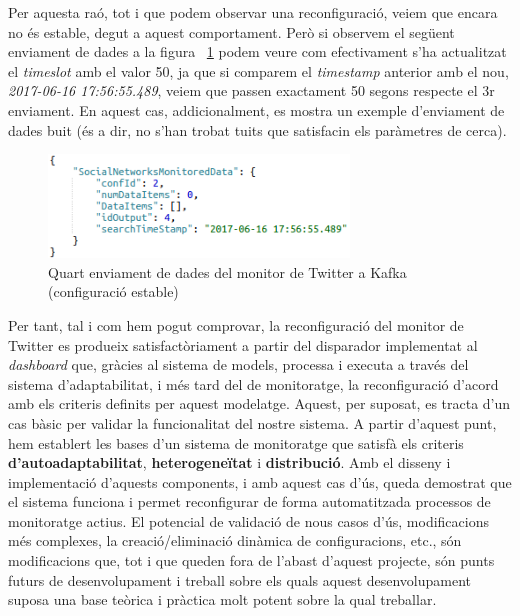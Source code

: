 Per aquesta raó, tot i que podem observar una reconfiguració, veiem que encara no és estable, degut a aquest comportament. Però si observem el següent enviament de dades a la figura ~\ref{fig:tfg4} podem veure com efectivament s'ha actualitzat el \textit{timeslot} amb el valor 50, ja que si comparem el \textit{timestamp} anterior amb el nou, \textit{2017-06-16 17:56:55.489}, veiem que passen exactament 50 segons respecte el 3r enviament. En aquest cas, addicionalment, es mostra un exemple d'enviament de dades buit (és a dir, no s'han trobat tuits que satisfacin els paràmetres de cerca). \\

\begin{figure}[H]
\centering
\includegraphics[width=8cm]{Figures/tfg4}
\decoRule
\caption{Quart enviament de dades del monitor de Twitter a Kafka (configuració estable)}
\label{fig:tfg4}
\end{figure} 

Per tant, tal i com hem pogut comprovar, la reconfiguració del monitor de Twitter es produeix satisfactòriament a partir del disparador implementat al \textit{dashboard} que, gràcies al sistema de models, processa i executa a través del sistema d'adaptabilitat, i més tard del de monitoratge, la reconfiguració d'acord amb els criteris definits per aquest modelatge. Aquest, per suposat, es tracta d'un cas bàsic per validar la funcionalitat del nostre sistema. A partir d'aquest punt, hem establert les bases d'un sistema de monitoratge que satisfà els criteris \textbf{d'autoadaptabilitat}, \textbf{heterogeneïtat} i \textbf{distribució}. Amb el disseny i implementació d'aquests components, i amb aquest cas d'ús, queda demostrat que el sistema funciona i permet reconfigurar de forma automatitzada processos de monitoratge actius. El potencial de validació de nous casos d'ús, modificacions més complexes, la creació/eliminació dinàmica de configuracions, etc., són modificacions que, tot i que queden fora de l'abast d'aquest projecte, són punts futurs de desenvolupament i treball sobre els quals aquest desenvolupament suposa una base teòrica i pràctica molt potent sobre la qual treballar.